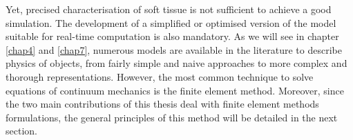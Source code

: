 Yet, precised characterisation of soft tissue is not sufficient to achieve a good simulation. The development of a simplified or optimised version of the model suitable for real-time computation is also mandatory. \OFF As we will see in chapter \ref{chap4} and \ref{chap7}, numerous models are available in the literature to describe physics of objects, from fairly simple and naive approaches to more complex and thorough representations. However, the most common technique to solve equations of continuum mechanics is the finite element method. Moreover, since the two main contributions of this thesis deal with finite element methods formulations, the general principles of this method will be detailed in the next section. 

